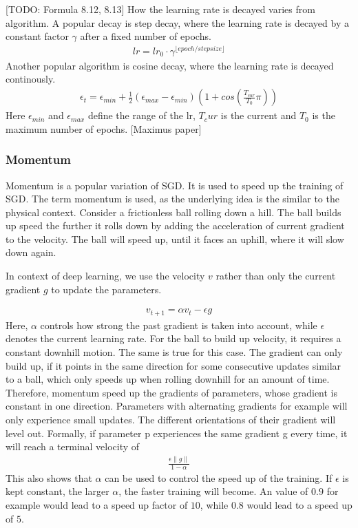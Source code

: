 [TODO: Formula 8.12, 8.13] How the learning rate is decayed varies from
algorithm. A popular decay is step decay, where the learning rate is decayed by
a constant factor $\gamma$ after a fixed number of epochs.
\begin{align}
    lr = lr_0 \cdot \gamma^{\lfloor epoch/stepsize \rfloor}
\end{align}
Another popular algorithm is cosine decay, where the learning rate is decayed
continously.
\begin{align}\label{eq:cosine_decay}
    \epsilon_t = \epsilon_{min} + \frac{1}{2} (\epsilon_{max} - \epsilon_{min})(1+cos(\frac{T_{cur}}{T_0}\pi))
\end{align}
Here $\epsilon_{min}$ and $\epsilon_{max}$ define the range of the lr, $T_cur$ is
the current and $T_0$ is the maximum number of epochs.
[Maximus paper]

\subsubsection{Momentum}
Momentum is a popular variation of SGD. It is used to speed up the training of
SGD. The term momentum is used, as the underlying idea is the similar to the
physical context. Consider a frictionless ball rolling down a hill. The ball
builds up speed the further it rolls down by adding the acceleration of current
gradient to the velocity. The ball will speed up, until it faces an uphill,
where it will slow down again.

In context of deep learning, we use the velocity $v$ rather than only the
current gradient $g$ to update the parameters.

\begin{align}
    v_{t+1}=\alpha v_t - \epsilon g
\end{align}
Here, $\alpha$ controls how strong the past gradient is taken into account,
while $\epsilon$ denotes the current learning rate. For the ball to build up
velocity, it requires a constant downhill motion. The same is true for this
case. The gradient can only build up, if it points in the same direction for
some consecutive updates similar to a ball, which only speeds up when rolling
downhill for an amount of time. Therefore, momentum speed up the gradients of
parameters, whose gradient is constant in one direction. Parameters with
alternating gradients for example will only experience small updates. The
different orientations of their gradient will level out. Formally, if parameter
p experiences the same gradient g every time, it will reach a terminal velocity
of
\begin{align}
    \frac{\epsilon \lVert g \rVert}{1-\alpha}
\end{align}
This also shows that $\alpha$ can be used to control the speed up of the
training. If $\epsilon$ is kept constant, the larger $\alpha$, the faster
training will become. An value of $0.9$ for example would lead to a speed up
factor of $10$, while $0.8$ would lead to a speed up of $5$.

